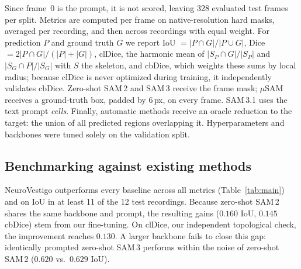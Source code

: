 \documentclass{article}
\begin{document}
Since frame~0 is the prompt, it is not scored, leaving 328 evaluated test frames per split. Metrics are computed per frame on native-resolution hard masks, averaged per recording, and then across recordings with equal weight. For prediction $P$ and ground truth $G$ we report IoU $=|P\cap G|/|P\cup G|$, Dice $=2|P\cap G|/(|P|+|G|)$, clDice, the harmonic mean of $|S_P\cap G|/|S_P|$ and $|S_G\cap P|/|S_G|$ with $S$ the skeleton, and cbDice, which weights these sums by local radius; because clDice is never optimized during training, it independently validates cbDice. Zero-shot SAM\,2 and SAM\,3 receive the frame mask; $\mu$SAM receives a ground-truth box, padded by 6\,px, on every frame. SAM\,3.1 uses the text prompt \emph{cells}. Finally, automatic methods receive an oracle reduction to the target: the union of all predicted regions overlapping it.
Hyperparameters and backbones were tuned solely on the validation split.

\subsection{Benchmarking against existing methods}
\label{sec:res:benchmark}

NeuroVestigo outperforms every baseline across all metrics (Table~\ref{tab:main}) and on IoU in at least 11 of the 12 test recordings. Because zero-shot SAM\,2 shares the same backbone and prompt, the resulting gains ($0.160$ IoU, $0.145$ cbDice) stem from our fine-tuning. On clDice, our independent topological check, the improvement reaches $0.130$. A larger backbone fails to close this gap: identically prompted zero-shot SAM\,3 performs within the noise of zero-shot SAM\,2 ($0.620$ vs.\ $0.629$ IoU).
\end{document}
